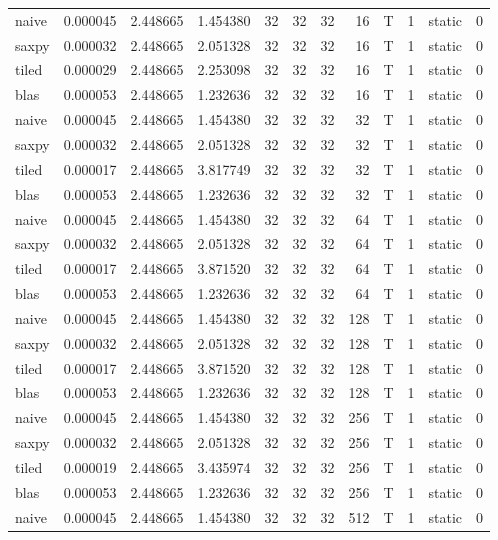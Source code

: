 \documentclass[
  12pt,
  xcolor = usenames,dvipsnames]{article}
\begin{document}
\begin{table}[!h]
{\begin{tabular}[t]{lrrrrrrrlrlr}
naive & 0.000045 & 2.448665 & 1.454380 & 32 & 32 & 32 & 16 & T & 1 & static & 0\\
saxpy & 0.000032 & 2.448665 & 2.051328 & 32 & 32 & 32 & 16 & T & 1 & static & 0\\
tiled & 0.000029 & 2.448665 & 2.253098 & 32 & 32 & 32 & 16 & T & 1 & static & 0\\
\addlinespace
blas & 0.000053 & 2.448665 & 1.232636 & 32 & 32 & 32 & 16 & T & 1 & static & 0\\
naive & 0.000045 & 2.448665 & 1.454380 & 32 & 32 & 32 & 32 & T & 1 & static & 0\\
saxpy & 0.000032 & 2.448665 & 2.051328 & 32 & 32 & 32 & 32 & T & 1 & static & 0\\
tiled & 0.000017 & 2.448665 & 3.817749 & 32 & 32 & 32 & 32 & T & 1 & static & 0\\
blas & 0.000053 & 2.448665 & 1.232636 & 32 & 32 & 32 & 32 & T & 1 & static & 0\\
\addlinespace
naive & 0.000045 & 2.448665 & 1.454380 & 32 & 32 & 32 & 64 & T & 1 & static & 0\\
saxpy & 0.000032 & 2.448665 & 2.051328 & 32 & 32 & 32 & 64 & T & 1 & static & 0\\
tiled & 0.000017 & 2.448665 & 3.871520 & 32 & 32 & 32 & 64 & T & 1 & static & 0\\
blas & 0.000053 & 2.448665 & 1.232636 & 32 & 32 & 32 & 64 & T & 1 & static & 0\\
naive & 0.000045 & 2.448665 & 1.454380 & 32 & 32 & 32 & 128 & T & 1 & static & 0\\
\addlinespace
saxpy & 0.000032 & 2.448665 & 2.051328 & 32 & 32 & 32 & 128 & T & 1 & static & 0\\
tiled & 0.000017 & 2.448665 & 3.871520 & 32 & 32 & 32 & 128 & T & 1 & static & 0\\
blas & 0.000053 & 2.448665 & 1.232636 & 32 & 32 & 32 & 128 & T & 1 & static & 0\\
naive & 0.000045 & 2.448665 & 1.454380 & 32 & 32 & 32 & 256 & T & 1 & static & 0\\
saxpy & 0.000032 & 2.448665 & 2.051328 & 32 & 32 & 32 & 256 & T & 1 & static & 0\\
\addlinespace
tiled & 0.000019 & 2.448665 & 3.435974 & 32 & 32 & 32 & 256 & T & 1 & static & 0\\
blas & 0.000053 & 2.448665 & 1.232636 & 32 & 32 & 32 & 256 & T & 1 & static & 0\\
naive & 0.000045 & 2.448665 & 1.454380 & 32 & 32 & 32 & 512 & T & 1 & static & 0\\

\end{tabular}}
\end{table}
\end{document}
